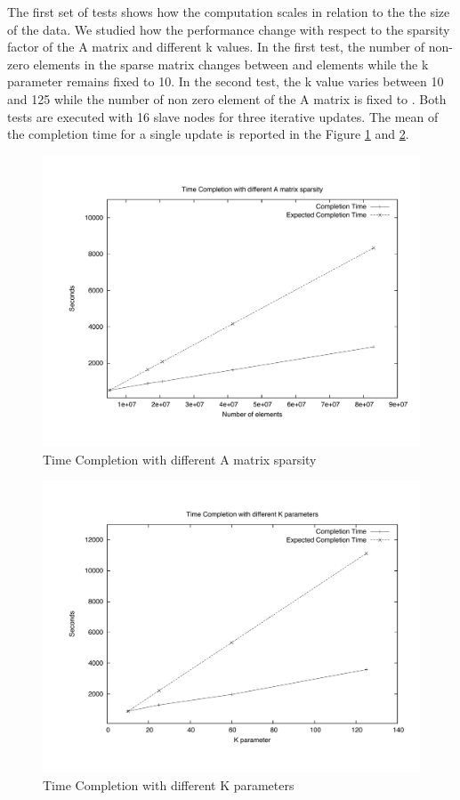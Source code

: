 The first set of tests shows how the computation scales in relation to the the size of the data. 
We studied how the performance change with respect to the sparsity factor of the A matrix and different k values. 
In the first test, the number of non-zero elements in the sparse matrix changes between  and  elements while the k parameter remains fixed to 10. 
In the second test, the k value varies between 10 and 125 while the number of non zero element of the A matrix is fixed to .  
Both tests are executed with 16 slave nodes for three iterative updates. 
The mean of the completion time for a single update is reported in the Figure \ref{DeltaVar}  and \ref{kVar}. 

\begin{figure}[th]
	\centerline{
		\mbox{\includegraphics[scale=0.48]{HadoopTest/PsFiles/DeltaVar.pdf}}
	}
	\caption{Time Completion with different A matrix sparsity} 
        \label{DeltaVar}
\end{figure}

\begin{figure}[th]
	\centerline{
		\mbox{\includegraphics[scale=0.48]{HadoopTest/PsFiles/kVar.pdf}}
	}
	\caption{Time Completion with different K parameters} 
        \label{kVar}
\end{figure}


